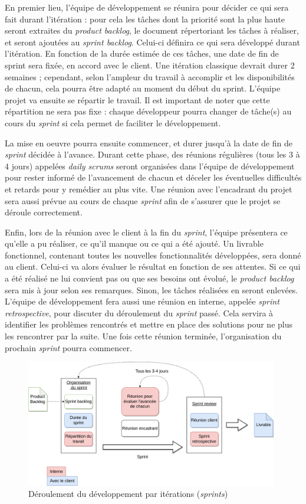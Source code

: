 \documentclass{article}
\begin{document}
En premier lieu, l'équipe de développement se réunira pour décider ce qui sera fait durant l'itération : pour cela les tâches dont la priorité sont la plus haute seront extraites du \emph{product backlog}, le document répertoriant les tâches à réaliser, et seront ajoutées au \emph{sprint backlog}. Celui-ci définira ce qui sera développé durant l'itération. En fonction de la durée estimée de ces tâches, une date de fin de sprint sera fixée, en accord avec le client. Une itération classique devrait durer 2 semaines ; cependant, selon l'ampleur du travail à accomplir et les disponibilités de chacun, cela pourra être adapté au moment du début du sprint.
L'équipe projet va ensuite se répartir le travail. Il est important de noter que cette répartition ne sera pas fixe : chaque développeur pourra changer de tâche(s) au cours du \emph{sprint} si cela permet de faciliter le développement.

La mise en oeuvre pourra ensuite commencer, et durer jusqu'à la date de fin de \emph{sprint} décidée à l'avance. Durant cette phase, des réunions régulières (tous les 3 à 4 jours) appelées \emph{daily scrums} seront organisées dans l'équipe de développement pour rester informé de l'avancement de chacun et déceler les éventuelles difficultés et retards pour y remédier au plus vite. Une réunion avec l'encadrant du projet sera aussi prévue au cours de chaque \emph{sprint} afin de s'assurer que le projet se déroule correctement.

Enfin, lors de la réunion avec le client à la fin du \emph{sprint}, l'équipe présentera ce qu'elle a pu réaliser, ce qu'il manque ou ce qui a été ajouté. Un livrable fonctionnel, contenant toutes les nouvelles fonctionnalités développées, sera donné au client. Celui-ci va alors évaluer le résultat en fonction de ses attentes. Si ce qui a été réalisé ne lui convient pas ou que ses besoins ont évolué, le \emph{product backlog} sera mis à jour selon ses remarques. Sinon, les tâches réalisées en seront enlevées.
L'équipe de développement fera aussi une réunion en interne, appelée \emph{sprint retrospective}, pour discuter du déroulement du \emph{sprint} passé. Cela servira à identifier les problèmes rencontrés et mettre en place des solutions pour ne plus les rencontrer par la suite. Une fois cette réunion terminée, l'organisation du prochain \emph{sprint} pourra commencer.


\begin{figure}[!h]
    \centering
    \includegraphics[width=11cm]{sprint-workflow.png}
    \caption{Déroulement du développement par itérations (\emph{sprints})}
    \label{fig:sprint-workflow}
\end{figure}
\end{document}
